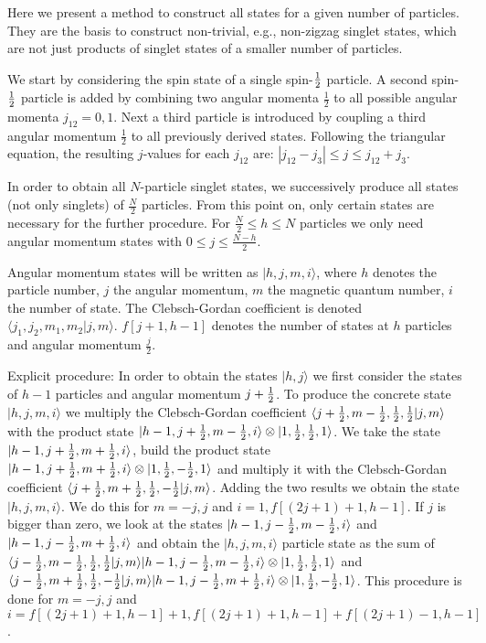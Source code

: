\documentclass[pra,amsfonts,showpacs,preprint,showkeys]{revtex4}
\begin{document}
Here we present a method to construct all states for a given
number of particles. They are the basis to construct non-trivial,
e.g., non-zigzag  singlet states, which are not just
products of singlet states of a smaller number of particles.


We start by considering the spin state of a single spin-${1\over
2}$ particle. A second spin-${1\over 2}$ particle is added by
combining two angular momenta $\frac{1}{2}$ to all possible
angular momenta $j_{12}=0,1$. Next a third particle is introduced
by coupling a third angular momentum $\frac{1}{2}$ to all
previously derived states. Following the triangular equation, the
resulting $j$-values for each $j_{12}$ are: $|j_{12}-j_3|\leq
j\leq j_{12}+j_3$.

In order to obtain all $N$-particle singlet states, we
successively produce all states (not only singlets) of
$\frac{N}{2}$ particles. From this point on, only certain states
are necessary for the further procedure. For $\frac{N}{2}\leq
h\leq N$ particles we only need angular momentum states with
$0\leq j\leq\frac{N-h}{2}$.

Angular momentum states will be written as
$|h,j,m,i\rangle$, where $h$ denotes the particle number, $j$ the
angular momentum, $m$ the magnetic quantum number, $i$ the number
of state. The Clebsch-Gordan coefficient is denoted $\langle
j_1,j_2,m_1,m_2|j,m\rangle$. $f[j+1,h-1]$ denotes the number of
states at $h$ particles and angular momentum $\frac{j}{2}$.

Explicit procedure: In order to obtain the states $|h,j\rangle $
we first consider the states of $h-1$ particles and angular
momentum $j+{1\over2}$. To produce the concrete state
$|h,j,m,i\rangle$ we multiply the Clebsch-Gordan coefficient
$\langle j+{1\over2},m-{1\over2},{1\over2},{1\over2}|j,m\rangle$
with the product state
$|h-1,j+{1\over2},m-{1\over2},i\rangle\otimes|1,{1\over2},{1\over2},1\rangle$.
We take the state $|h-1,j+{1\over2},m+{1\over2},i\rangle$, build
the product state
$|h-1,j+{1\over2},m+{1\over2},i\rangle\otimes|1,{1\over2},-{1\over2},1\rangle$
and multiply it with the Clebsch-Gordan coefficient $\langle
j+{1\over2},m+{1\over2},{1\over2},-{1\over2}|j,m\rangle$. Adding
the two results we obtain the state $|h,j,m,i\rangle$. We do this
for $m= -j,j$ and $i= 1, f[(2j+1)+1,h-1]$. If $j$ is bigger than
zero, we look at the states
$|h-1,j-{1\over2},m-{1\over2},i\rangle$ and
$|h-1,j-{1\over2},m+{1\over2},i\rangle$ and obtain the
$|h,j,m,i\rangle$ particle state as the sum of $\langle
j-{1\over2},m-{1\over2},{1\over2},{1\over2}|j,m\rangle|h-1,j-{1\over2},m-{1\over2},i\rangle\otimes|1,{1\over2},{1\over2},1\rangle$
and $\langle
j-{1\over2},m+{1\over2},{1\over2},-{1\over2}|j,m\rangle|h-1,j-{1\over2},m+{1\over2},i\rangle\otimes|1,{1\over2},-{1\over2},1\rangle$.
This procedure is done for $m= -j,j$ and $i=
f[(2j+1)+1,h-1]+1,f[(2j+1)+1,h-1]+f[(2j+1)-1,h-1]$.
\end{document}
